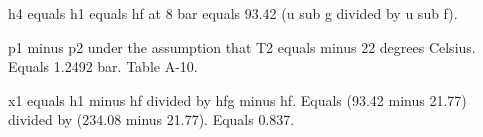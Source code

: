 h4 equals h1 equals hf at 8 bar equals 93.42 (u sub g divided by u sub f).  

p1 minus p2 under the assumption that T2 equals minus 22 degrees Celsius.  
Equals 1.2492 bar.  
Table A-10.  

x1 equals h1 minus hf divided by hfg minus hf.  
Equals (93.42 minus 21.77) divided by (234.08 minus 21.77).  
Equals 0.837.